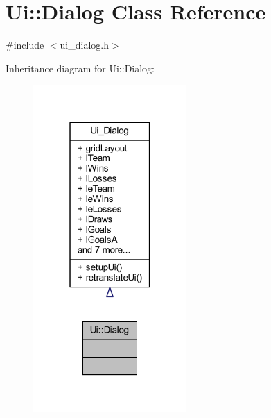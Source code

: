 \hypertarget{class_ui_1_1_dialog}{}\section{Ui\+:\+:Dialog Class Reference}
\label{class_ui_1_1_dialog}


{\ttfamily \#include $<$ui\+\_\+dialog.\+h$>$}



Inheritance diagram for Ui\+:\+:Dialog\+:
\nopagebreak
\begin{figure}[H]
\begin{center}
\leavevmode
\includegraphics[width=166pt]{de/d05/class_ui_1_1_dialog__inherit__graph}
\end{center}
\end{figure}


